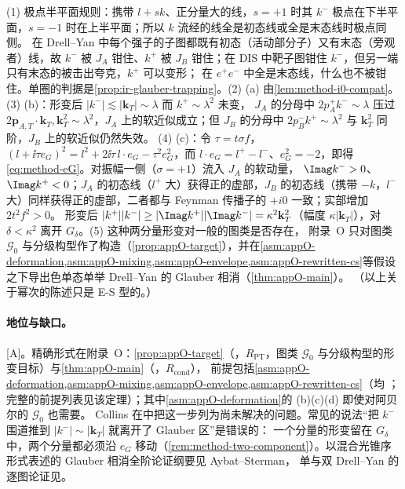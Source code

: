 \begin{proofsketch}
(1) 极点半平面规则：携带 $l+sk$、正分量大的线，$s=+1$ 时其 $k^-$ 极点在下半平面，$s=-1$ 时在上半平面；所以 $k$ 流经的线全是初态线或全是末态线时极点同侧。
在 Drell--Yan 中每个强子的子图都既有初态（活动部分子）又有末态（旁观者）线，故 $k^-$ 被 $J_A$ 钳住、$k^+$ 被 $J_B$ 钳住；在 DIS 中靶子图钳住 $k^-$，但另一端只有末态的被击出夸克，$k^+$ 可以变形；
在 $e^+e^-$ 中全是末态线，什么也不被钳住。单圈的判据是\cref{prop:ir-glauber-trapping}。(2) (a) 由\cref{lem:method-i0-compat}。(3) (b)：形变后 $|k^-|\lesssim|\mathbf k_T|\sim\lambda$ 而 $k^+\sim\lambda^2$ 未变，
$J_A$ 的分母中 $2p_A^+k^-\sim\lambda$ 压过 $2\mathbf p_{A,T}\cdot\mathbf k_T,\mathbf k_T^2\sim\lambda^2$，$J_A$ 上的软近似成立；但 $J_B$ 的分母中 $2p_B^-k^+\sim\lambda^2$ 与 $\mathbf k_T^2$ 同阶，$J_B$ 上的软近似仍然失效。
(4) (c)：令 $\tau=t\sigma f$，$(l+\ii\tau e_G)^2=l^2+2\ii\tau\,l\cdot e_G-\tau^2e_G^2$，而 $l\cdot e_G=l^+-l^-$、$e_G^2=-2$，即得\cref{eq:method-eG}。对振幅一侧（$\sigma=+1$）流入 $J_A$ 的软动量，
$\Imag k^->0$、$\Imag k^+<0$；$J_A$ 的初态线（$l^+$ 大）获得正的虚部，$J_B$ 的初态线（携带 $-k$，$l^-$ 大）同样获得正的虚部，二者都与 Feynman 传播子的 $+i0$ 一致；实部增加 $2t^2f^2>0$。
形变后 $|k^+||k^-|\ge|\Imag k^+||\Imag k^-|=\kappa^2\mathbf k_T^2$（幅度 $\kappa|\mathbf k_T|$），对 $\delta<\kappa^2$ 离开 $G_\delta$。(5) 这种两分量形变对一般的图类是否存在，
附录~O 只对图类 $\mathcal G_0$ 与分级构型作了构造（\cref{prop:appO-target}），并在\cref{asm:appO-deformation,asm:appO-mixing,asm:appO-envelope,asm:appO-rewritten-cs}等假设之下导出色单态单举 Drell--Yan 的 Glauber 相消（\cref{thm:appO-main}）。
（以上关于幂次的陈述只是 E-S 型的。）
\end{proofsketch}

\paragraph{地位与缺口。}[A]。精确形式在附录~O：\cref{prop:appO-target}（\tagR，$R_{\mathrm{PT}}$，图类 $\mathcal G_0$ 与分级构型的形变目标）与\cref{thm:appO-main}（\tagR，$R_{\mathrm{cond}}$），
前提包括\cref{asm:appO-deformation,asm:appO-mixing,asm:appO-envelope,asm:appO-rewritten-cs}（均 \tagA；完整的前提列表见该定理）；其中\cref{asm:appO-deformation}的 (b)(c)(d) 即使对阿贝尔的 $\mathcal G_0$ 也需要。
Collins 在\cite[第~14.4.8~节]{Collins2011}中把这一步列为尚未解决的问题。常见的说法“把 $k^-$ 围道推到 $|k^-|\sim|\mathbf k_T|$ 就离开了 Glauber 区”是错误的：
一个分量的形变留在 $G_\delta$ 中，两个分量都必须沿 $e_G$ 移动（\cref{rem:method-two-component}）。以混合光锥序形式表述的 Glauber 相消全阶论证纲要见 Aybat--Sterman\cite{AybatSterman2009}，
单与双 Drell--Yan 的逐图论证见\cite{Diehl:2015bca}。

